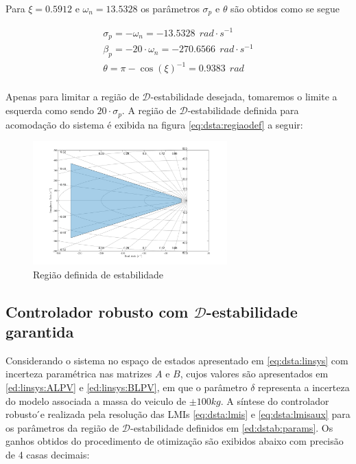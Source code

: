 Para $\xi=0.5912$ e $\omega_n=13.5328$ os parâmetros $\sigma_p$ e $\theta$ são obtidos como se segue

\begin{equation}\label{ed:dstab:params}
    \begin{split}
       \sigma_p=-\omega_n=-13.5328\ \ rad\cdot s^{-1}\\
       \beta_p=-20\cdot\omega_n=-270.6566\ \ rad\cdot s^{-1}\\
       \theta=\pi-\cos{(\xi)}^{-1}=0.9383\ \ rad\\    
    \end{split}
\end{equation}

Apenas para limitar a região de \( \mathcal{D}\)-estabilidade desejada, tomaremos o limite a esquerda como sendo $20\cdot\sigma_p$. A região de \( \mathcal{D}\)-estabilidade definida para acomodação do sistema é exibida na figura \eqref{eq:dsta:regiaodef} a seguir:

\FloatBarrier
\begin{figure}[htbp] 
  \begin{centering}
    \includegraphics[width=7.5cm]{img/regiao_d_estabilidade.png}
    \caption{Região definida de estabilidade}
    \label{eq:dsta:regiaodef}
  \end{centering}
\end{figure}
\FloatBarrier

\subsection{Controlador robusto com \( \mathcal{D}\)-estabilidade garantida}\label{subsec:res:control}
Considerando o sistema no espaço de estados apresentado em \eqref{eq:dsta:linsys} com incerteza paramétrica nas matrizes $A$ e $B$, cujos valores são apresentados em \eqref{ed:linsys:ALPV} e \eqref{ed:linsys:BLPV}, em que o parâmetro $\delta$ representa a incerteza do modelo associada a massa do veiculo de $\pm100kg$. A síntese do  controlador  robusto ́e  realizada  pela  resolução das LMIs \eqref{eq:dsta:lmis} e \eqref{eq:dsta:lmisaux} para os parâmetros da região de \( \mathcal{D}\)-estabilidade definidos em \eqref{ed:dstab:params}. Os ganhos obtidos do procedimento de otimização são exibidos abaixo com precisão de 4 casas decimais:


